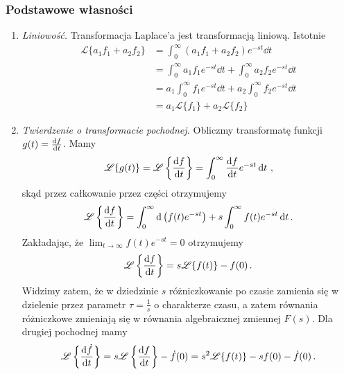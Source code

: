 \documentclass[../main.tex]{subfiles}
\begin{document}
\subsubsection*{Podstawowe własności}
\begin{enumerate}
    \item \textit{Liniowość.} Transformacja Laplace'a jest transformacją liniową. Istotnie
    \begin{equation*}
    \begin{split}
        \mathscr{L}\{a_1f_1+a_2f_2\}&=\int_0^\infty(a_1f_1+a_2f_2)e^{-st}\dd{t}\\
        &=\int_0^\infty a_1f_1e^{-st}\dd{t}+\int_0^\infty a_2f_2e^{-st}\dd{t}\\
        &=a_1\int_0^\infty f_1e^{-st}\dd{t}+a_2\int_0^\infty f_2e^{-st}\dd{t}\\
        &=a_1\mathscr{L}\{f_1\}+a_2\mathscr{L}\{f_2\}
    \end{split}
    \end{equation*}
    
    \item \textit{Twierdzenie o transformacie pochodnej.} Obliczmy transformatę funkcji
    \(g(t)=\dv{f}{t}\). Mamy
    \begin{equation*}
        \mathscr{L}\{g(t)\}=\mathscr{L}\left\{\dv{f}{t}\right\}=\int_0^\infty \dv{f}{t}e^{-st}\dd{t}\,,
    \end{equation*}
    skąd przez całkowanie przez części otrzymujemy
    \begin{equation*}
        \mathscr{L}\left\{\dv{f}{t}\right\}=\int_0^\infty \dd\left(f(t)e^{-st}\right)+s\int_0^\infty f(t)e^{-st}\,\dd t\,.
    \end{equation*}
    Zakładając, że \(\lim_{t\to\infty}f(t)e^{-st}=0\) otrzymujemy
    \begin{equation*}
        \mathscr{L}\left\{\dv{f}{t}\right\}=s\mathscr{L}\{f(t)\}-f(0)\,.
    \end{equation*}
    Widzimy zatem, że w dziedzinie \(s\) różniczkowanie po czasie zamienia się w dzielenie przez
    parametr \(\tau=\frac{1}{s}\) o charakterze czasu, a zatem równania różniczkowe zmieniają się w
    równania algebraicznej zmiennej \(F(s)\). Dla drugiej pochodnej mamy
    \begin{equation*}
        \mathscr{L}\left\{\dv{\dot f}{t}\right\}=s\mathscr{L}\left\{\dv{f}{t}\right\}-\dot f(0)=s^2\mathscr{L}\{f(t)\}-sf(0)-\dot f(0)\,.
    \end{equation*}
\end{enumerate}
\end{document}
